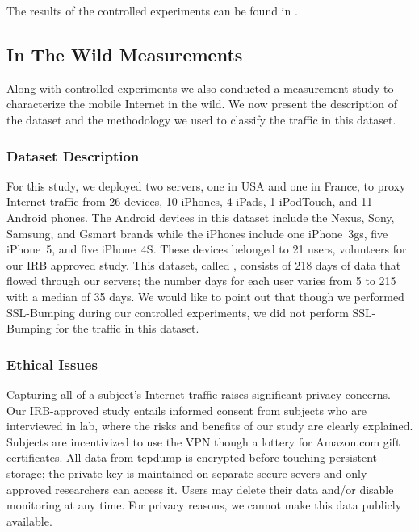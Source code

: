 The results of the controlled experiments can be found in .

\subsection{In The Wild Measurements}

Along with controlled experiments we also conducted a measurement study to characterize the mobile Internet in the wild.
We now present the description of the dataset and the methodology we used to classify the traffic in this dataset.

\subsubsection{Dataset Description}

For this study, we deployed two \platname servers, one in USA and one in France, to proxy Internet traffic from 26 devices, 10 iPhones, 4 iPads, 1 iPodTouch, and 11 Android phones.
The Android devices in this dataset include the Nexus, Sony, Samsung, and Gsmart brands while the iPhones include one iPhone~3gs, five iPhone~5, and five iPhone~4S.
These devices belonged to 21 users, volunteers for our IRB approved study.
This dataset, called \mobWild, consists of 218 days of data that flowed through our \platname servers; the number days for each user varies from 5 to 215 with a median of 35 days.
We would like to point out that though we performed SSL-Bumping during our controlled experiments, we did not perform SSL-Bumping for the traffic in this dataset.

\subsubsection{Ethical Issues}

Capturing all of a subject's Internet traffic raises significant
privacy concerns. Our IRB-approved study entails informed consent from
subjects who are interviewed in lab, where the risks and benefits of
our study are clearly explained. Subjects are incentivized to use the
VPN though a lottery for Amazon.com gift certificates. All data from
tcpdump is encrypted before touching persistent storage; the private
key is maintained on separate secure severs and only approved
researchers can access it. Users may delete their data and/or disable
monitoring at any time. For privacy reasons, we cannot make this data
publicly available.


